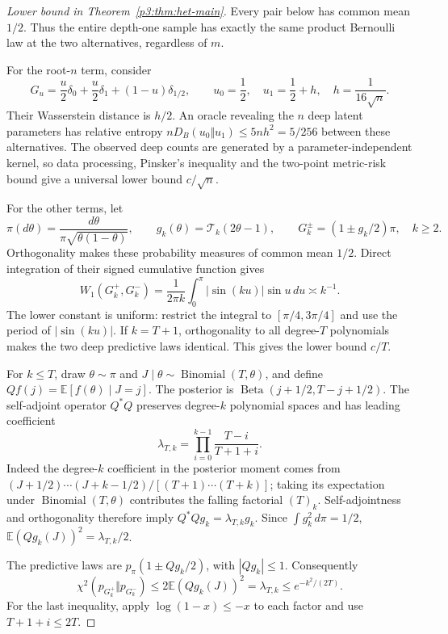 \documentclass[11pt,a4paper]{article}
\theoremstyle{definition}
\theoremstyle{remark}
\numberwithin{equation}{section}
\begin{document}
\begin{proof}[Lower bound in Theorem~\ref{p3:thm:het-main}]
Every pair below has common mean $1/2$.  Thus the entire depth-one sample
has exactly the same product Bernoulli law at the two alternatives,
regardless of $m$.

For the root-$n$ term, consider
\[
 G_u=\frac u2\delta_0+\frac u2\delta_1+(1-u)\delta_{1/2},
 \qquad u_0=\frac12,\quad u_1=\frac12+h,
 \quad h=\frac1{16\sqrt n}.
\]
Their Wasserstein distance is $h/2$.  An oracle revealing the $n$ deep
latent parameters has relative entropy
$nD_B(u_0\Vert u_1)\le5nh^2=5/256$ between these alternatives.
The observed deep counts are generated by a parameter-independent kernel,
so data processing, Pinsker's inequality and the two-point metric-risk
bound give a universal lower bound $c/\sqrt n$.

For the other terms, let
\[
 \pi(d\theta)=\frac{d\theta}{\pi\sqrt{\theta(1-\theta)}},\qquad
 g_k(\theta)=\mathcal T_k(2\theta-1),\qquad
 G_k^\pm=(1\pm g_k/2)\pi,\quad k\ge2.
\]
Orthogonality makes these probability measures of common mean $1/2$.
Direct integration of their signed cumulative function gives
\begin{equation}\label{p3:eq:het-witness-distance}
 W_1(G_k^+,G_k^-)
  =\frac1{2\pi k}\int_0^\pi|\sin(ku)|\sin u\,du
  \asymp k^{-1}.
\end{equation}
The lower constant is uniform: restrict the integral to
$[\pi/4,3\pi/4]$ and use the period of $|\sin(ku)|$.
If $k=T+1$, orthogonality to all degree-$T$ polynomials makes the two
deep predictive laws identical.  This gives the lower bound $c/T$.

For $k\le T$, draw $\theta\sim\pi$ and
$J\mid\theta\sim\operatorname{Binomial}(T,\theta)$, and define
$Qf(j)=\mathbb E[f(\theta)\mid J=j]$.  The posterior is
$\operatorname{Beta}(j+1/2,T-j+1/2)$.  The self-adjoint operator $Q^*Q$
preserves degree-$k$ polynomial spaces and has leading coefficient
\[
 \lambda_{T,k}=\prod_{i=0}^{k-1}\frac{T-i}{T+1+i}.
\]
Indeed the degree-$k$ coefficient in the posterior moment comes from
$(J+1/2)\cdots(J+k-1/2)/[(T+1)\cdots(T+k)]$; taking its expectation
under $\operatorname{Binomial}(T,\theta)$ contributes the falling
factorial $(T)_k$.  Self-adjointness and orthogonality therefore imply
$Q^*Qg_k=\lambda_{T,k}g_k$.  Since $\int g_k^2\,d\pi=1/2$,
$\mathbb E(Qg_k(J))^2=\lambda_{T,k}/2$.

The predictive laws are $p_\pi(1\pm Qg_k/2)$, with $|Qg_k|\le1$.
Consequently
\begin{equation}\label{p3:eq:het-witness-chi}
 \chi^2(p_{G_k^+}\Vert p_{G_k^-})
 \le2\mathbb E(Qg_k(J))^2
 =\lambda_{T,k}\le e^{-k^2/(2T)}.
\end{equation}
For the last inequality, apply $\log(1-x)\le-x$ to each factor and
use $T+1+i\le2T$.


\end{proof}
\end{document}
